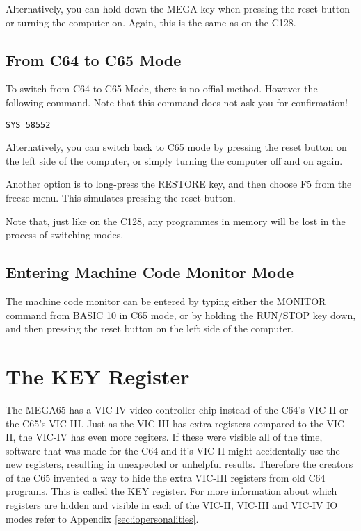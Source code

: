 Alternatively, you can hold down the MEGA key when pressing the reset button or turning the computer on. Again,
this is the same as on the C128.

\subsection{From C64 to C65 Mode}

To switch from C64 to C65 Mode, there is no offial method.  However the following command.  Note that this command
does not ask you for confirmation!

\begin{tcolorbox}[colback=black,coltext=white]
\verbatimfont{\codefont}
\begin{verbatim}
SYS 58552
\end{verbatim}
\end{tcolorbox}

Alternatively, you can switch back to C65 mode by pressing the reset
button on the left side of the computer, or simply turning the
computer off and on again.  

Another option is to long-press the RESTORE key, and then choose F5
from the freeze menu.  This simulates pressing the reset button. 

Note that, just like on the C128, any programmes in memory will be
lost in the process of switching modes. 

\subsection{Entering Machine Code Monitor Mode}

The machine code monitor can be entered by typing either the MONITOR
command from BASIC 10 in C65 mode, or by holding the RUN/STOP key
down, and then pressing the reset button on the left side of the
computer. 

\section{The KEY Register}

The MEGA65 has a VIC-IV video controller chip instead of the C64's VIC-II or
the C65's VIC-III.  Just as the VIC-III has extra registers compared to the
VIC-II, the VIC-IV has even more regiters.  If these were visible all of the time,
software that was made for the C64 and it's VIC-II might accidentally use the
new registers, resulting in unexpected or unhelpful results.  Therefore the
creators of the C65 invented a way to hide the extra VIC-III registers from old
C64 programs. This is called the KEY register. For more information
about which registers are hidden and visible in each of the
VIC-II, VIC-III and VIC-IV IO modes refer to Appendix \ref{sec:iopersonalities}.

